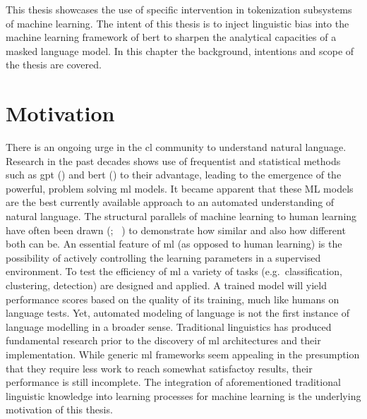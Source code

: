 
This thesis showcases the use of specific intervention in tokenization subsystems of machine learning.
The intent of this thesis is to inject linguistic bias into the machine learning framework of \ac{bert} to sharpen the analytical capacities of a masked language model.
In this chapter the background, intentions and scope of the thesis are covered.


\section{Motivation}
\label{sec:motivation}
There is an ongoing urge in the \acf{cl} community to understand natural language.
Research in the past decades shows use of frequentist and statistical methods such as \ac{gpt} (\cite{gpt}) and \ac{bert} (\cite{ATTENTION}) to their advantage, leading to the emergence of the powerful, problem solving \ac{ml} models.
It became apparent that these ML models are the best currently available approach to an automated understanding of natural language.
The structural parallels of machine learning to human learning have often been drawn (\citeauthor{humanmachinelearning1}; ~\cite{humanmachinelearning2}) to demonstrate how similar and also how different both can be.
An essential feature of \ac{ml} (as opposed to human learning) is the possibility of actively controlling the learning parameters in a supervised environment.
To test the efficiency of  \ac{ml} a variety of tasks (e.g.\ classification, clustering, detection) are designed and applied.
A trained model will yield performance scores based on the quality of its training, much like humans on language tests.
Yet, automated modeling of language is not the first instance of language modelling in a broader sense.
Traditional linguistics has produced fundamental research prior to the discovery of \ac{ml} architectures and their implementation.
While generic \ac{ml} frameworks seem appealing in the presumption that they require less work to reach somewhat satisfactoy results,
their performance is still incomplete.
The integration of aforementioned traditional linguistic knowledge into learning processes for machine learning is the underlying motivation of this thesis.

